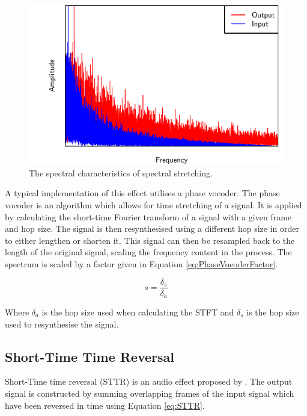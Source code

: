 		\begin{figure}[h!]
			\centering
			\includegraphics{chapter3/Images/SpectralStretchingSpectrum.pdf}
			\caption{The spectral characteristics of spectral stretching.}
			\label{fig:SpectralStretching}
		\end{figure}

		A typical implementation of this effect utilises a phase vocoder. The phase vocoder is an algorithm which
		allows for time stretching of a signal. It is applied by calculating the short-time Fourier transform of a
		signal with a given frame and hop size. The signal is then resynthesised using a different hop size in order
		to either lengthen or shorten it. This signal can then be resampled back to the length of the original
		signal, scaling the frequency content in the process. The spectrum is scaled by a factor given in Equation
		\ref{eq:PhaseVocoderFactor}.

		\begin{equation}
			s = \frac{\delta_{s}}{\delta_{a}}
			\label{eq:PhaseVocoderFactor}
		\end{equation}

		Where $\delta_{a}$ is the hop size used when calculating the STFT and $\delta_{s}$ is the hop size used to
		resynthesise the signal.

	\subsection{Short-Time Time Reversal}
	\label{sec:Excitation-Methods-STTR}
		Short-Time time reversal (STTR) is an audio effect proposed by \citet{kim2014shorttime}. The output signal
		is constructed by summing overlapping frames of the input signal which have been reversed in time using
		Equation \ref{eq:STTR}.

